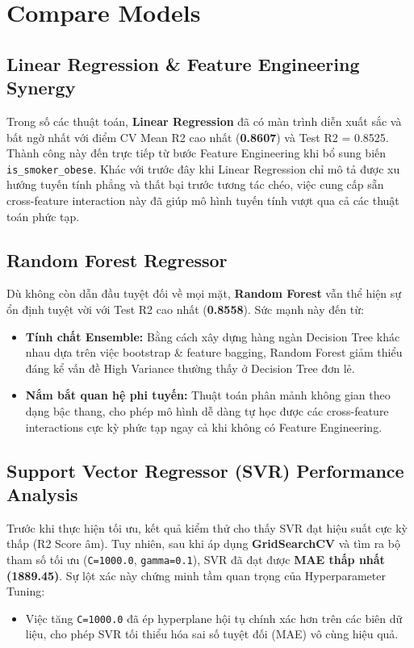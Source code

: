 \section{Compare Models}

\subsection{Linear Regression \& Feature Engineering Synergy}
Trong số các thuật toán, \textbf{Linear Regression} đã có màn trình diễn xuất sắc và bất ngờ nhất với điểm CV Mean R2 cao nhất (\textbf{0.8607}) và Test R2 = 0.8525. Thành công này đến trực tiếp từ bước Feature Engineering khi bổ sung biến \texttt{is\_smoker\_obese}. Khác với trước đây khi Linear Regression chỉ mô tả được xu hướng tuyến tính phẳng và thất bại trước tương tác chéo, việc cung cấp sẵn cross-feature interaction này đã giúp mô hình tuyến tính vượt qua cả các thuật toán phức tạp.

\subsection{Random Forest Regressor}
Dù không còn dẫn đầu tuyệt đối về mọi mặt, \textbf{Random Forest} vẫn thể hiện sự ổn định tuyệt vời với Test R2 cao nhất (\textbf{0.8558}). Sức mạnh này đến từ:
\begin{itemize}
    \item \textbf{Tính chất Ensemble:} Bằng cách xây dựng hàng ngàn Decision Tree khác nhau dựa trên việc bootstrap \& feature bagging, Random Forest giảm thiểu đáng kể vấn đề High Variance thường thấy ở Decision Tree đơn lẻ.
    \item \textbf{Nắm bắt quan hệ phi tuyến:} Thuật toán phân mảnh không gian theo dạng bậc thang, cho phép mô hình dễ dàng tự học được các cross-feature interactions cực kỳ phức tạp ngay cả khi không có Feature Engineering.
\end{itemize}

\subsection{Support Vector Regressor (SVR) Performance Analysis}
Trước khi thực hiện tối ưu, kết quả kiểm thử cho thấy SVR đạt hiệu suất cực kỳ thấp (R2 Score âm). Tuy nhiên, sau khi áp dụng \textbf{GridSearchCV} và tìm ra bộ tham số tối ưu (\texttt{C=1000.0}, \texttt{gamma=0.1}), SVR đã đạt được \textbf{MAE thấp nhất (1889.45)}. 
Sự lột xác này chứng minh tầm quan trọng của Hyperparameter Tuning:
\begin{itemize}
    \item Việc tăng \texttt{C=1000.0} đã ép hyperplane hội tụ chính xác hơn trên các biên dữ liệu, cho phép SVR tối thiểu hóa sai số tuyệt đối (MAE) vô cùng hiệu quả.
\end{itemize}

